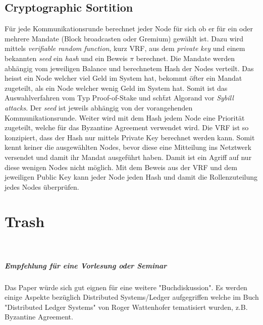 \documentclass[11pt,a4paper]{article}
\begin{document}
\section*{Cryptographic Sortition}
F\"ur jede Kommunikationsrunde berechnet jeder Node f\"ur sich ob er f\"ur ein oder mehrere Mandate (Block broadcasten oder Gremium) gew\"ahlt ist.
Dazu wird mittels \textit{verifiable random function}, kurz VRF, aus dem \textit{private key} und einem bekannten \textit{seed} ein \textit{hash} und ein Beweis $\pi$ berechnet.
Die Mandate werden abh\"angig vom jeweiligen Balance und berechnetem Hash der Nodes verteilt.
Das heisst ein Node welcher viel Geld im System hat, bekommt \"ofter ein Mandat zugeteilt, als ein Node welcher wenig Geld im System hat.
Somit ist das Auswahlverfahren vom Typ Proof-of-Stake und sch\"tzt Algorand vor \textit{Sybill attacks}.
Der \textit{seed} ist jeweils abh\"angig von der vorangehenden Kommunikationsrunde.
Weiter wird mit dem Hash jedem Node eine Priorit\"at zugeteilt, welche f\"ur das Byzantine Agreement verwendet wird.
Die VRF ist so konzipiert, dass der Hash nur mittels Private Key berechnet werden kann.
Somit kennt keiner die ausgew\"ahlten Nodes, bevor diese eine Mitteilung ins Netztwerk versendet und
damit ihr Mandat ausgef\"uhrt haben.
Damit ist ein Agriff auf nur diese wenigen Nodes nicht m\"oglich.
Mit dem Beweis aus der VRF und dem jeweiligen Public Key kann jeder Node jeden Hash und damit die Rollenzuteilung jedes Nodes \"uberpr\"ufen.

% 
{}



\newpage

\chapter{\textbf{\Large Trash}}\\

\paragraph*{Empfehlung f\"ur eine Vorlesung oder Seminar}
Das Paper \cite{Gilad:2017:ASB:3132747.3132757} w\"urde sich gut eignen f\"ur eine weitere "Buchdiskussion".
Es werden einige Aspekte bez\"uglich Distributed Systems/Ledger aufgegriffen welche
im Buch "Distributed Ledger Systems" von Roger Wattenhofer tematisiert wurden, z.B. Byzantine Agreement.
\end{document}
